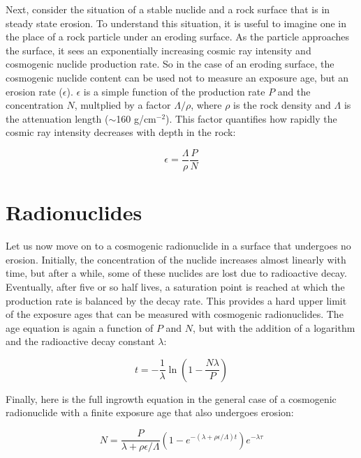 \documentclass{book}
\begin{document}
Next, consider the situation of a stable nuclide and a rock surface
that is in steady state erosion. To understand this situation, it is
useful to imagine one in the place of a rock particle under an eroding
surface. As the particle approaches the surface, it sees an
exponentially increasing cosmic ray intensity and cosmogenic nuclide
production rate. So in the case of an eroding surface, the cosmogenic
nuclide content can be used not to measure an exposure age, but an
erosion rate ($\epsilon$). $\epsilon$ is a simple function of the
production rate $P$ and the concentration $N$, multplied by a factor
$\Lambda/\rho$, where $\rho$ is the rock density and $\Lambda$ is the
attenuation length ($\sim$160 g/cm$^{-2}$).  This factor quantifies
how rapidly the cosmic ray intensity decreases with depth in the rock:

\begin{equation}
\epsilon = \frac{\Lambda}{\rho} \frac{P}{N}
\label{eq:cosmo-erosion}
\end{equation}

\section{Radionuclides}

Let us now move on to a cosmogenic radionuclide in a surface that
undergoes no erosion. Initially, the concentration of the nuclide
increases almost linearly with time, but after a while, some of these
nuclides are lost due to radioactive decay. Eventually, after five or
so half lives, a saturation point is reached at which the production
rate is balanced by the decay rate. This provides a hard upper limit
of the exposure ages that can be measured with cosmogenic
radionuclides. The age equation is again a function of $P$ and $N$,
but with the addition of a logarithm and the radioactive decay
constant $\lambda$:

\begin{equation}
t = -\frac{1}{\lambda} \ln\left(1-\frac{N\lambda}{P}\right)
\label{eq:cosmo-radioexposure}
\end{equation}

Finally, here is the full ingrowth equation in the general case of a
cosmogenic radionuclide with a finite exposure age that also undergoes
erosion:

\begin{equation}
N = \frac{P}{\lambda + \rho\epsilon/\Lambda}
\left(1-e^{-(\lambda+\rho\epsilon/\Lambda)t}\right) e^{-\lambda\tau}
\label{eq:cosmo-N}
\end{equation}
\end{document}

